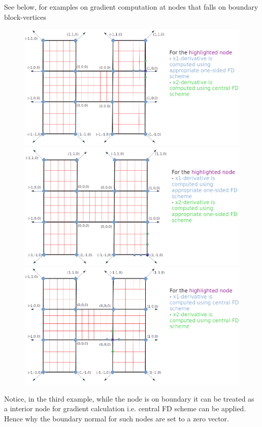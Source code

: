 \documentclass[a4paper,12pt]{article}
\begin{document}
See below, for examples on gradient computation at nodes that falls on boundary block-vertices
\begin{figure}[H]
	\centering
	\includegraphics[scale=0.23]{figures/VertBdryNrml_Grad1.png}
	\includegraphics[scale=0.23]{figures/VertBdryNrml_Grad2.png}
	\includegraphics[scale=0.23]{figures/VertBdryNrml_Grad3.png}
\end{figure}
Notice, in the third example, while the node is on boundary it can be treated as a interior node for gradient calculation i.e. central FD scheme can be applied. Hence why the boundary normal for such nodes are set to a zero vector.
\end{document}
